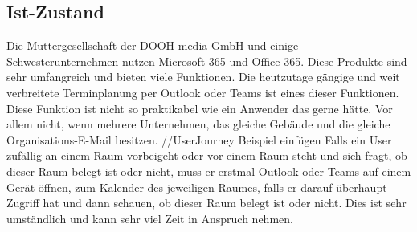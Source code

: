 


\pagebreak
\subsection{Ist-Zustand}\label{sec:ist-zustand}
Die Muttergesellschaft der DOOH media GmbH und einige Schwesterunternehmen nutzen Microsoft 365 und Office 365.
Diese Produkte sind sehr umfangreich und bieten viele Funktionen.
Die heutzutage gängige und weit verbreitete Terminplanung per Outlook oder Teams ist eines dieser Funktionen.
Diese Funktion ist nicht so praktikabel wie ein Anwender das gerne hätte.
Vor allem nicht, wenn mehrere Unternehmen, das gleiche Gebäude und die gleiche Organisations-E-Mail besitzen.
\newline
//UserJourney Beispiel einfügen
\newline
Falls ein User zufällig an einem Raum vorbeigeht oder vor einem Raum steht und sich fragt, ob dieser Raum belegt ist oder nicht, muss er erstmal Outlook oder Teams auf einem Gerät öffnen, zum Kalender des jeweiligen Raumes, falls er darauf überhaupt Zugriff hat und dann schauen, ob dieser Raum belegt ist oder nicht.
Dies ist sehr umständlich und kann sehr viel Zeit in Anspruch nehmen.

